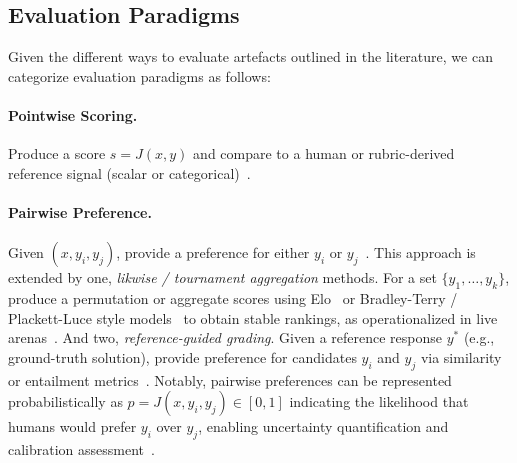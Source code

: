 \subsection{Evaluation Paradigms}
Given the different ways to evaluate artefacts outlined in the literature, we can categorize evaluation paradigms as follows:
\paragraph{Pointwise Scoring.} Produce a score $s = J(x,y)$ and compare to a human or rubric-derived reference signal (scalar or categorical)~\cite{fu2023gptscore, li2024_llmsasjudges}. 
\paragraph{Pairwise Preference.} Given $(x, y_i, y_j)$, provide a preference for either $y_i$ or $y_j$~\cite{zheng2023judgelm}. This approach is extended by one, \emph{likwise / tournament aggregation} methods. For a set $\{y_1,\dots,y_k\}$, produce a permutation or aggregate scores using Elo~\cite{elo1978rating, zheng2023judgelm} or Bradley-Terry / Plackett-Luce style models~\cite{bradley1952rank} to obtain stable rankings, as operationalized in live arenas~\cite{zheng2023judgelm}. And two, \emph{reference-guided grading}. Given a reference response $y^{*}$ (e.g., ground-truth solution), provide preference for candidates $y_i$ and $y_j$ via similarity or entailment metrics~\cite{zheng2023judgelm}. Notably, pairwise preferences can be represented probabilistically as $p = J(x,y_i,y_j) \in [0,1]$ indicating the likelihood that humans would prefer $y_i$ over $y_j$, enabling uncertainty quantification and calibration assessment~\cite{stiennon2020learning, ouyang2022training}.

